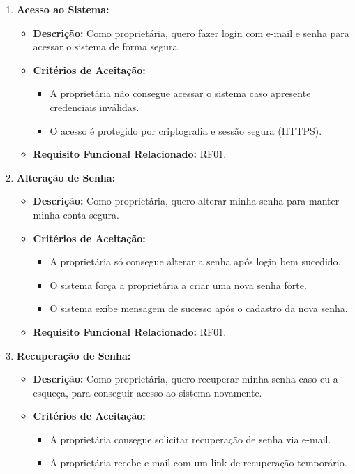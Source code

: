 \documentclass[
	12pt,				%
	openany,			%
	oneside,			%
	a4paper,			%
	english,			%
	french,				%
	spanish,			%
	brazil				%
	]{abntex2}
\begin{document}
\begin{enumerate}[label=\textbf{\arabic*.}]
	\item \textbf{Acesso ao Sistema:}
	\begin{itemize}
		\item \textbf{Descrição:} Como proprietária, quero fazer login com e-mail e senha para acessar o sistema de forma segura. 
		\item	\textbf{Critérios de Aceitação:}	
		\begin{itemize} 
			\item A proprietária não consegue acessar o sistema caso apresente credenciais inválidas.
			\item O acesso é protegido por criptografia e sessão segura (HTTPS).
		\end{itemize}
		\item \textbf{Requisito Funcional Relacionado:} RF01.
	\end{itemize} 
	\item \textbf{Alteração de Senha:}
	\begin{itemize}
		\item \textbf{Descrição:} Como proprietária, quero alterar minha senha para manter minha conta segura.
		\item \textbf{Critérios de Aceitação:}
		\begin{itemize} 
			\item A proprietária só consegue alterar a senha após login bem sucedido.
			\item O sistema força a proprietária a criar uma nova senha forte.
			\item O sistema exibe mensagem de sucesso após o cadastro da nova senha.
		\end{itemize}
		\item \textbf{Requisito Funcional Relacionado:} RF01.
	\end{itemize} 
	\item \textbf{Recuperação de Senha:}
	\begin{itemize}
		\item \textbf{Descrição:} Como proprietária, quero recuperar minha senha caso eu a esqueça, para conseguir acesso ao sistema novamente.
		\item \textbf{Critérios de Aceitação:}
		\begin{itemize} 
			\item A proprietária consegue solicitar recuperação de senha via e-mail.
			\item A proprietária recebe e-mail com um link de recuperação temporário.

\end{itemize}
\end{itemize}
\end{enumerate}
\end{document}
